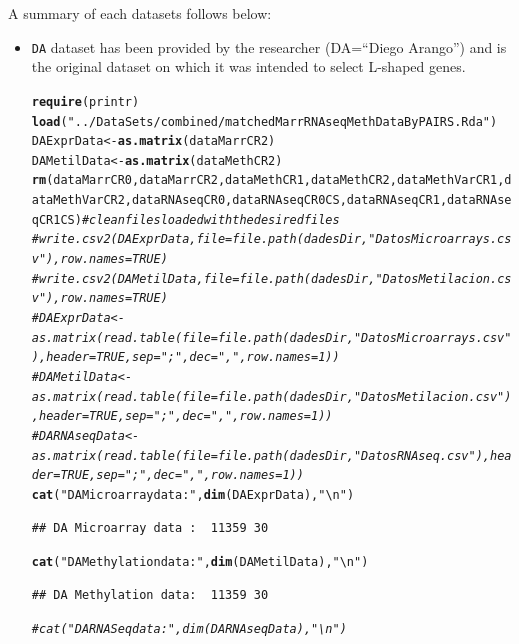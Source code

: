 \documentclass[a4paper,10pt]{article}\usepackage[]{graphicx}\usepackage[]{color}
\makeatletter
\newcommand{\hlstr}[1]{\textcolor[rgb]{0.192,0.494,0.8}{#1}}%
\newcommand{\hlcom}[1]{\textcolor[rgb]{0.678,0.584,0.686}{\textit{#1}}}%
\newcommand{\hlstd}[1]{\textcolor[rgb]{0.345,0.345,0.345}{#1}}%
\newcommand{\hlkwb}[1]{\textcolor[rgb]{0.69,0.353,0.396}{#1}}%
\newcommand{\hlkwd}[1]{\textcolor[rgb]{0.737,0.353,0.396}{\textbf{#1}}}%
\newenvironment{kframe}{%
 \def\at@end@of@kframe{}%
 \ifinner\ifhmode%
  \def\at@end@of@kframe{\end{minipage}}%
  \begin{minipage}{\columnwidth}%
 \fi\fi%
 \def\FrameCommand##1{\hskip\@totalleftmargin \hskip-\fboxsep
 \colorbox{shadecolor}{##1}\hskip-\fboxsep
     \hskip-\linewidth \hskip-\@totalleftmargin \hskip\columnwidth}%
 \MakeFramed {\advance\hsize-\width
   \@totalleftmargin\z@ \linewidth\hsize
   \@setminipage}}%
 {\par\unskip\endMakeFramed%
 \at@end@of@kframe}
\newenvironment{knitrout}{}{} %
\makeatother
\begin{document}
A summary of each datasets follows below:
\begin{itemize}
\item \texttt{DA} dataset has been provided by the researcher (DA=``Diego Arango'') and is the original dataset on which it was intended to select L-shaped  genes.

\begin{knitrout}
\color{fgcolor}\begin{kframe}
\begin{alltt}
\hlkwd{require}\hlstd{(printr)}
\hlkwd{load}\hlstd{(}\hlstr{"../DataSets/combined/matchedMarrRNAseqMethDataByPAIRS.Rda"}\hlstd{)}
\hlstd{DAExprData} \hlkwb{<-} \hlkwd{as.matrix}\hlstd{(dataMarrCR2)}
\hlstd{DAMetilData} \hlkwb{<-} \hlkwd{as.matrix}\hlstd{(dataMethCR2)}
\hlkwd{rm}\hlstd{(dataMarrCR0,dataMarrCR2, dataMethCR1, dataMethCR2, dataMethVarCR1, dataMethVarCR2, dataRNAseqCR0, dataRNAseqCR0CS, dataRNAseqCR1, dataRNAseqCR1CS)} \hlcom{# clean files loaded with the desired files}
\hlcom{#write.csv2(DAExprData, file=file.path(dadesDir,"DatosMicroarrays.csv"),row.names = TRUE)}
\hlcom{# write.csv2(DAMetilData, file=file.path(dadesDir,"DatosMetilacion.csv"),row.names = TRUE)}
\hlcom{# DAExprData <- as.matrix(read.table(file=file.path(dadesDir,"DatosMicroarrays.csv"), header=TRUE, sep=";", dec=",", row.names = 1))}
\hlcom{# DAMetilData <- as.matrix(read.table(file=file.path(dadesDir,"DatosMetilacion.csv"), header=TRUE, sep=";",dec=",", row.names = 1))}
\hlcom{# DARNAseqData <- as.matrix(read.table(file=file.path(dadesDir,"DatosRNAseq.csv"), header=TRUE, sep=";",dec=",", row.names = 1))}
\hlkwd{cat}\hlstd{(}\hlstr{"DA Microarray data : "}\hlstd{,} \hlkwd{dim}\hlstd{(DAExprData),} \hlstr{"\textbackslash{}n"}\hlstd{)}
\end{alltt}
\begin{verbatim}
## DA Microarray data :  11359 30
\end{verbatim}
\begin{alltt}
\hlkwd{cat}\hlstd{(}\hlstr{"DA Methylation data: "}\hlstd{,} \hlkwd{dim}\hlstd{(DAMetilData),} \hlstr{"\textbackslash{}n"}\hlstd{)}
\end{alltt}
\begin{verbatim}
## DA Methylation data:  11359 30
\end{verbatim}
\begin{alltt}
\hlcom{# cat("DA RNASeq data     : ", dim(DARNAseqData), "\textbackslash{}n")}
\end{alltt}
\end{kframe}
\end{knitrout}


\end{itemize}
\end{document}
